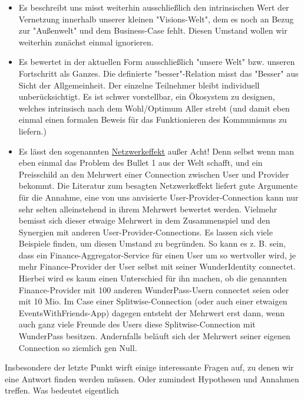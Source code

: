 \begin{itemize}
  \item Es beschreibt uns misst weiterhin ausschließlich den intrinsischen Wert der Vernetzung innerhalb unserer kleinen "Visions-Welt", dem es noch an Bezug zur "Außenwelt" und dem Business-Case fehlt. Diesen Umstand wollen wir weiterhin zunächst einmal ignorieren.
  \item Es bewertet in der aktuellen Form ausschließlich "unsere Welt" bzw. unseren Fortschritt als Ganzes. Die definierte "besser"-Relation misst das "Besser" aus Sicht der Allgemeinheit. Der einzelne Teilnehmer bleibt individuell unberücksichtigt. Es ist schwer vorstellbar, ein Ökosystem zu designen, welches intrinsisch nach dem Wohl/Optimum Aller strebt (und damit eben einmal einen formalen Beweis für das Funktionieren des Kommunismus zu liefern.) 
  \item Es lässt den sogenannten \href{https://de.wikipedia.org/wiki/Netzwerkeffekt}{Netzwerkeffekt} außer Acht! Denn selbst wenn man eben einmal das Problem des Bullet 1 aus der Welt schafft, und ein Preisschild an den Mehrwert einer Connection zwischen User und Provider bekommt. Die Literatur zum besagten Netzwerkeffekt liefert gute Argumente für die Annahme, eine von uns anvisierte User-Provider-Connection kann nur sehr selten alleinstehend in ihrem Mehrwert bewertet werden. Vielmehr bemisst sich dieser etwaige Mehrwert in dem Zusammenspiel und den Synergien mit anderen User-Provider-Connections. Es lassen sich viele Beispiele finden, um diesen Umstand zu begründen. So kann es z. B. sein, dass ein Finance-Aggregator-Service für einen User um so wertvoller wird, je mehr Finance-Provider der User selbst mit seiner WunderIdentity connectet. Hierbei wird es kaum einen Unterschied für ihn machen, ob die genannten Finance-Provider mit 100 anderen WunderPass-Usern connectet seien oder mit 10 Mio. Im Case einer Splitwise-Connection (oder auch einer etwaigen EventsWithFriends-App) dagegen entsteht der Mehrwert erst dann, wenn auch ganz viele Freunde des Users diese Splitwise-Connection mit WunderPass besitzen. Andernfalls beläuft sich der Mehrwert seiner eigenen Connection so ziemlich gen Null.
\end{itemize}

\vspace{1cm}

Insbesondere der letzte Punkt wirft einige interessante Fragen auf, zu denen wir eine Antwort finden werden müssen. Oder zumindest Hypothesen und Annahmen treffen.
Was bedeutet eigentlich

